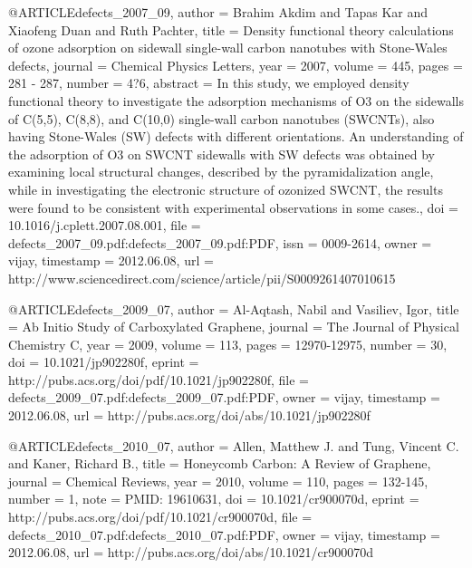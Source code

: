 
@ARTICLE{defects_2007_09,
  author = {Brahim Akdim and Tapas Kar and Xiaofeng Duan and Ruth Pachter},
  title = {Density functional theory calculations of ozone adsorption on sidewall
	single-wall carbon nanotubes with Stone-Wales defects},
  journal = {Chemical Physics Letters},
  year = {2007},
  volume = {445},
  pages = {281 - 287},
  number = {4?6},
  abstract = {In this study, we employed density functional theory to investigate
	the adsorption mechanisms of O3 on the sidewalls of C(5,5), C(8,8),
	and C(10,0) single-wall carbon nanotubes (SWCNTs), also having Stone-Wales
	(SW) defects with different orientations. An understanding of the
	adsorption of O3 on SWCNT sidewalls with SW defects was obtained
	by examining local structural changes, described by the pyramidalization
	angle, while in investigating the electronic structure of ozonized
	SWCNT, the results were found to be consistent with experimental
	observations in some cases.},
  doi = {10.1016/j.cplett.2007.08.001},
  file = {defects_2007_09.pdf:defects_2007_09.pdf:PDF},
  issn = {0009-2614},
  owner = {vijay},
  timestamp = {2012.06.08},
  url = {http://www.sciencedirect.com/science/article/pii/S0009261407010615}
}

@ARTICLE{defects_2009_07,
  author = {Al-Aqtash, Nabil and Vasiliev, Igor},
  title = {Ab Initio Study of Carboxylated Graphene},
  journal = {The Journal of Physical Chemistry C},
  year = {2009},
  volume = {113},
  pages = {12970-12975},
  number = {30},
  doi = {10.1021/jp902280f},
  eprint = {http://pubs.acs.org/doi/pdf/10.1021/jp902280f},
  file = {defects_2009_07.pdf:defects_2009_07.pdf:PDF},
  owner = {vijay},
  timestamp = {2012.06.08},
  url = {http://pubs.acs.org/doi/abs/10.1021/jp902280f}
}

@ARTICLE{defects_2010_07,
  author = {Allen, Matthew J. and Tung, Vincent C. and Kaner, Richard B.},
  title = {Honeycomb Carbon: A Review of Graphene},
  journal = {Chemical Reviews},
  year = {2010},
  volume = {110},
  pages = {132-145},
  number = {1},
  note = {PMID: 19610631},
  doi = {10.1021/cr900070d},
  eprint = {http://pubs.acs.org/doi/pdf/10.1021/cr900070d},
  file = {defects_2010_07.pdf:defects_2010_07.pdf:PDF},
  owner = {vijay},
  timestamp = {2012.06.08},
  url = {http://pubs.acs.org/doi/abs/10.1021/cr900070d}
}

